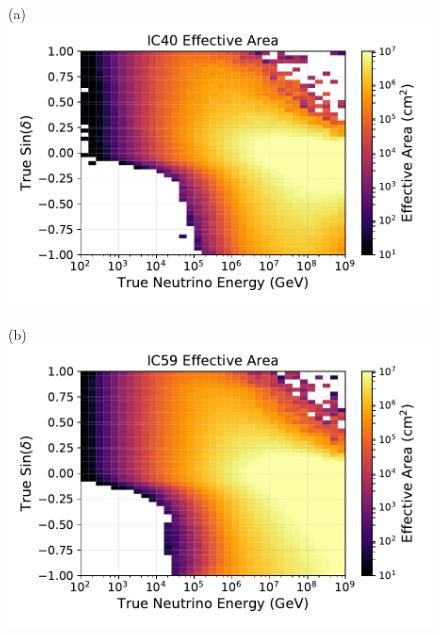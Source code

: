 \documentclass[aps,10pt,prd,twocolumn,floats,letterpaper,showpacs,nofootinbib,bibnotes,notitlepage,superscriptaddress,floatfix]{revtex4-1}
\begin{document}
\begin{figure}[t]\centering
\begin{minipage}[c][6.5cm][c]{0.49\textwidth}\centering
{(a)}\\\includegraphics[width=\linewidth]{./PublicReleasePlots/EffectiveAreaPlots/IC40_effectiveArea.pdf}
\end{minipage}
\begin{minipage}[c][6.5cm][c]{0.49\textwidth}\centering
{(b)}\\\includegraphics[width=\linewidth]{./PublicReleasePlots/EffectiveAreaPlots/IC59_effectiveArea.pdf}
\end{minipage}\\
\begin{minipage}[c][6.5cm][c]{0.49\textwidth}\centering

\end{minipage}
\end{figure}
\end{document}
